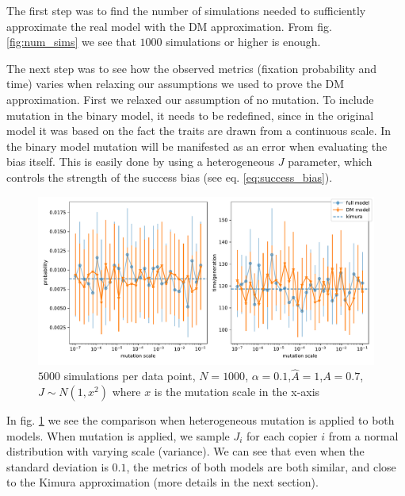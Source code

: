 \documentclass[11pt]{article}
\begin{document}
The first step was to find the number of simulations needed to sufficiently approximate the real model with the DM approximation. From fig. \ref{fig:num_sims} we see that $1000$ simulations or higher is enough.

The next step was to see how the observed metrics (fixation probability and time) varies when relaxing our assumptions we used to prove the DM approximation.
First we relaxed our assumption of no mutation. To include mutation in the binary model, it needs to be redefined, since in the original model it was based on the fact the traits are drawn from a continuous scale. In the binary model mutation will be manifested as an error when evaluating the bias itself. This is easily done by using a heterogeneous $J$ parameter, which controls the strength of the success bias (see eq. \ref{eq:success_bias}).


\begin{figure}
    \includegraphics[width=\linewidth]{../figures/binary/full_vs_dm_mutation.pdf}
  \caption{$5000$ simulations per data point, $N=1000$, $\alpha=0.1$,$\hat{A}=1$,$A=0.7$, $J\sim N(1,x^2)$ where $x$ is the mutation scale in the x-axis}	
  \label{fig:hetro_mutation}
\end{figure}


In fig. \ref{fig:hetro_mutation} we see the comparison when heterogeneous mutation is applied to both models. When mutation is applied, we sample $J_i$ for each copier $i$ from a normal distribution with varying scale (variance).
We can see that even when the standard deviation is $0.1$, the metrics of both models are both similar, and close to the Kimura approximation (more details in the next section). 
\end{document}
